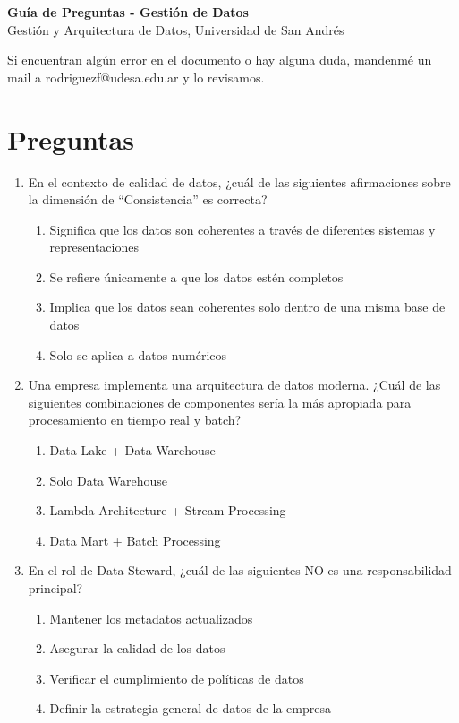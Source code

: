 \documentclass[12pt]{article}
\begin{document}
\begin{center}
  {\LARGE \textbf{Guía de Preguntas - Gestión de Datos}}\\[0.5em]
  {Gestión y Arquitectura de Datos, Universidad de San Andrés}
\end{center}

Si encuentran algún error en el documento o hay alguna duda, mandenmé un mail a rodriguezf@udesa.edu.ar y lo revisamos.

\section*{Preguntas}

\begin{enumerate}[label=\arabic*.]

\item En el contexto de calidad de datos, ¿cuál de las siguientes afirmaciones sobre la dimensión de ``Consistencia'' es correcta?
\begin{enumerate}
    \item Significa que los datos son coherentes a través de diferentes sistemas y representaciones
    \item Se refiere únicamente a que los datos estén completos
    \item Implica que los datos sean coherentes solo dentro de una misma base de datos
    \item Solo se aplica a datos numéricos
\end{enumerate}

\item Una empresa implementa una arquitectura de datos moderna. ¿Cuál de las siguientes combinaciones de componentes sería la más apropiada para procesamiento en tiempo real y batch?
\begin{enumerate}
    \item Data Lake + Data Warehouse
    \item Solo Data Warehouse
    \item Lambda Architecture + Stream Processing
    \item Data Mart + Batch Processing
\end{enumerate}

\item En el rol de Data Steward, ¿cuál de las siguientes NO es una responsabilidad principal?
\begin{enumerate}
    \item Mantener los metadatos actualizados
    \item Asegurar la calidad de los datos
    \item Verificar el cumplimiento de políticas de datos
    \item Definir la estrategia general de datos de la empresa
\end{enumerate}


\end{enumerate}
\end{document}
